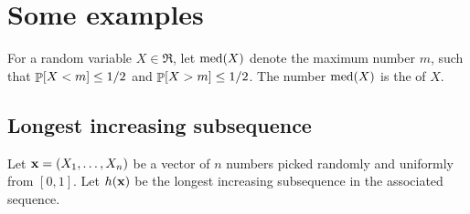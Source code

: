 
\section{Some examples}

\begin{defn}
    For a random variable $X \in \Re$, let $\mathrm{med}(X)$ denote the
    maximum number $m$, such that $\Prob{X < m} \leq 1/2$ and
    $\Prob{X > m} \leq 1/2$. The number $\mathrm{med}(X)$ is the
     of $X$.
\end{defn}


\subsection{Longest increasing subsequence}

Let $\mathbf{x} = (X_1, \ldots, X_n)$ be a vector of $n$ numbers picked
randomly and uniformly from $[0,1]$. Let $h(\mathbf{x})$ be the longest
increasing subsequence in the associated sequence.

